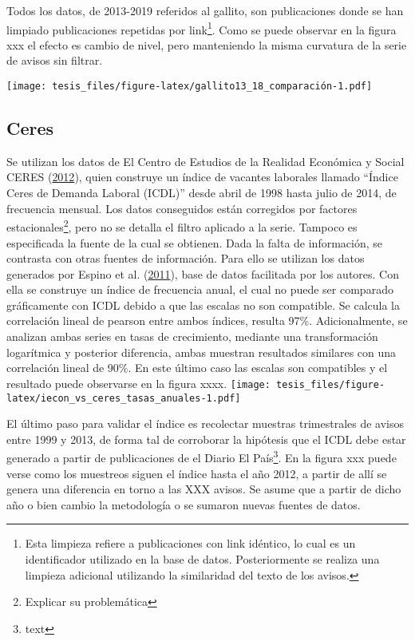 \documentclass[12pt,twoside]{reedthesis}
\begin{document}
Todos los datos, de 2013-2019 referidos al gallito, son publicaciones donde se han limpiado publicaciones repetidas por link\footnote{Esta limpieza refiere a publicaciones con link idéntico, lo cual es un identificador utilizado en la base de datos. Posteriormente se realiza una limpieza adicional utilizando la similaridad del texto de los avisos.}. Como se puede observar en la figura xxx el efecto es cambio de nivel, pero manteniendo la misma curvatura de la serie de avisos sin filtrar.

\texttt{[image: tesis\_files/figure-latex/gallito13\_18\_comparación-1.pdf]}

\hypertarget{ceres}{%
\subsection*{Ceres}\label{ceres}}

Se utilizan los datos de El Centro de Estudios de la Realidad Económica y Social CERES (\protect\hyperlink{ref-Ceres2012}{2012}), quien construye un índice de vacantes laborales llamado ``Índice Ceres de Demanda Laboral (ICDL)'' desde abril de 1998 hasta julio de 2014, de frecuencia mensual. Los datos conseguidos están corregidos por factores estacionales\footnote{Explicar su problemática}, pero no se detalla el filtro aplicado a la serie. Tampoco es especificada la fuente de la cual se obtienen.
Dada la falta de información, se contrasta con otras fuentes de información. Para ello se utilizan los datos generados por Espino et al. (\protect\hyperlink{ref-Alma2011}{2011}), base de datos facilitada por los autores. Con ella se construye un índice de frecuencia anual, el cual no puede ser comparado gráficamente con ICDL debido a que las escalas no son compatible.
Se calcula la correlación lineal de pearson entre ambos índices, resulta 97\%. Adicionalmente, se analizan ambas series en tasas de crecimiento, mediante una transformación logarítmica y posterior diferencia, ambas muestran resultados similares con una correlación lineal de 90\%. En este último caso las escalas son compatibles y el resultado puede observarse en la figura xxxx.
\texttt{[image: tesis\_files/figure-latex/iecon\_vs\_ceres\_tasas\_anuales-1.pdf]}

El último paso para validar el índice es recolectar muestras trimestrales de avisos entre 1999 y 2013, de forma tal de corroborar la hipótesis que el ICDL debe estar generado a partir de publicaciones de el Diario El País\footnote{text}. En la figura xxx puede verse como los muestreos siguen el índice hasta el año 2012, a partir de allí se genera una diferencia en torno a las XXX avisos. Se asume que a partir de dicho año o bien cambio la metodología o se sumaron nuevas fuentes de datos.
\end{document}
